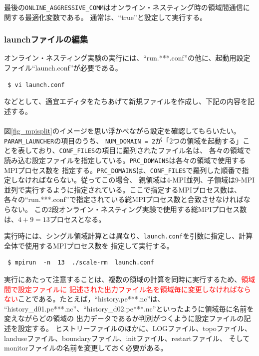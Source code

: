 最後の\verb|ONLINE_AGGRESSIVE_COMM|はオンライン・ネスティング時の領域間通信に関する最適化変数である。
通常は、``true''と設定して実行する。


\subsubsection{launchファイルの編集}
オンライン・ネスティング実験の実行には、``run.***.conf''の他に、起動用設定ファイル``launch.conf''が必要である。
\begin{verbatim}
 $ vi launch.conf
\end{verbatim}
などとして、適宜エディタをたちあげて新規ファイルを作成し、下記の内容を記述する。\\

\\

\noindent 図\ref{fig_mpisplit}のイメージを思い浮かべながら設定を確認してもらいたい。\verb|PARAM_LAUNCHER|の項目のうち、
\verb|NUM_DOMAIN = 2|が「2つの領域を起動する」ことを表しており、\verb|CONF_FILES|の項目に羅列されたファイル名は、
各々の領域で読み込む設定ファイルを指定している。\verb|PRC_DOMAINS|は各々の領域で使用するMPIプロセス数を
指定する。\verb|PRC_DOMAINS|は、\verb|CONF_FILES|で羅列した順番で指定しなければならない。従ってこの場合、
親領域は4-MPI並列、子領域は9-MPI並列で実行するように指定されている。ここで指定するMPIプロセス数は、
各々の``run.***.conf''で指定されている総MPIプロセス数と合致させなければならない。
この2段オンライン・ネスティング実験で使用する総MPIプロセス数は、$4 + 9 = 13$プロセスとなる。

実行時には、シングル領域計算とは異なり、\verb|launch.conf|を引数に指定し、計算全体で使用するMPIプロセス数を
指定して実行する。
\begin{verbatim}
 $ mpirun  -n  13  ./scale-rm  launch.conf
\end{verbatim}

実行にあたって注意することは、複数の領域の計算を同時に実行するため、\textcolor{red}{領域間で設定ファイルに
記述された出力ファイル名を領域毎に変更しなければならない}ことである。たとえば，``history.pe***.nc''は、
``history\_d01.pe***.nc''、``history\_d02.pe***.nc''といったように領域毎に名前を変えながらどの領域の
出力データであるか判別がつくように設定ファイルの記述を設定する。
ヒストリーファイルのほかに、LOGファイル、topoファイル、landuseファイル、boundaryファイル、initファイル、restartファイル、
そしてmonitorファイルの名前を変更しておく必要がある。


